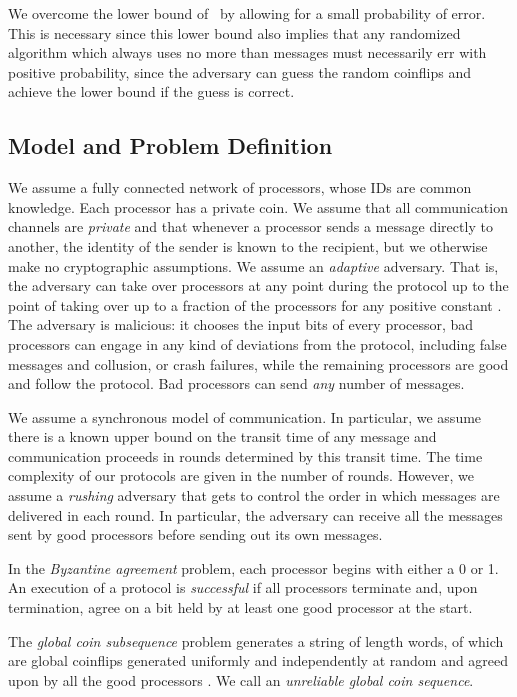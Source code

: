 \documentclass[letterpaper,11pt]{article}
\begin{document}
We overcome the lower bound of~\cite{DR} by allowing for a small probability of error.  This is necessary since this lower bound also implies that any randomized algorithm which always uses no more than  messages must necessarily err with positive probability, since the adversary can guess the random coinflips
and achieve the lower bound if the guess is correct.




\subsection{Model and Problem Definition}
 We assume a fully connected network of  processors, whose IDs are common knowledge.  Each processor has a private coin.  We assume that all communication channels are \emph{private} and that whenever a processor sends a message directly to another, the identity of the sender is known to the recipient, but we otherwise make no cryptographic assumptions.  We assume an {\it adaptive} adversary. That is, the adversary can take over processors at any point during the protocol up to the point of taking over up to a  fraction of the processors for any positive constant .  The adversary is malicious: it  chooses the input bits of every processor,  bad processors can engage in any kind of deviations from the protocol, including false messages and collusion, or crash failures, while the remaining processors are good and follow the protocol. Bad processors can send {\it any} number of messages.

We assume a synchronous model of communication.  In particular, we assume there is a known upper bound on the transit time of any message and communication proceeds in rounds determined by this transit time.  The time complexity of our protocols are given in the number of rounds.  However, we assume a \emph{rushing} adversary that gets to control the order in which messages are delivered in each round.  In particular, the adversary can receive all the messages sent by good processors before sending out its own messages.

In the {\it  Byzantine agreement}  problem, each processor begins with either a 0 or 1. An execution of a protocol is {\it successful} if all processors  terminate and, upon termination, agree on a bit held by at least one good  processor at the start.  

The  {\it  global coin subsequence}   problem  generates a string of length  words,  of  which are global coinflips generated uniformly and independently at random and agreed upon by all the good processors . We call  an  {\it unreliable global coin sequence}.
\end{document}
